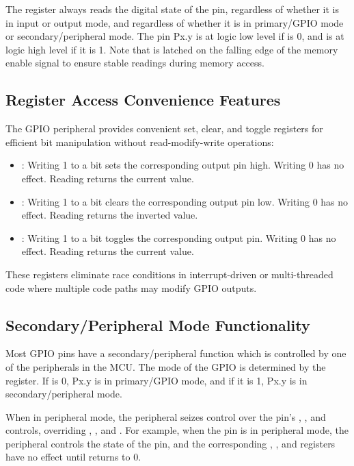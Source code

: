 The  register always reads the digital state of the pin, regardless of whether it is in input or output mode, and regardless of whether it is in primary/GPIO mode or secondary/peripheral mode. The pin Px.y is at logic low level if  is 0, and is at logic high level if it is 1. Note that  is latched on the falling edge of the memory enable signal to ensure stable readings during memory access.

\subsection{Register Access Convenience Features}

The GPIO peripheral provides convenient set, clear, and toggle registers for efficient bit manipulation without read-modify-write operations:

\begin{itemize}
\item {}: Writing 1 to a bit sets the corresponding output pin high. Writing 0 has no effect. Reading returns the current  value.
\item {}: Writing 1 to a bit clears the corresponding output pin low. Writing 0 has no effect. Reading returns the inverted  value.
\item {}: Writing 1 to a bit toggles the corresponding output pin. Writing 0 has no effect. Reading returns the current  value.
\end{itemize}

These registers eliminate race conditions in interrupt-driven or multi-threaded code where multiple code paths may modify GPIO outputs.


\subsection{Secondary/Peripheral Mode Functionality}

Most GPIO pins have a secondary/peripheral function which is controlled by one of the peripherals in the MCU. The mode of the GPIO is determined by the  register. If  is 0, Px.y is in primary/GPIO mode, and if it is 1, Px.y is in secondary/peripheral mode.

When in peripheral mode, the peripheral seizes control over the pin's , , and  controls, overriding , , and . For example, when the  pin is in peripheral mode, the  peripheral controls the state of the pin, and the corresponding , , and  registers have no effect until  returns to 0.


